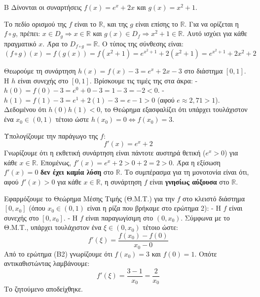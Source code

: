 \begin{thema}{Β}
Δίνονται οι συναρτήσεις $f(x) = e^x + 2x$ και $g(x) = x^2 + 1$.
\begin{erwthma}
\item Το πεδίο ορισμού της $f$ είναι το $\mathbb{R}$, και της $g$ είναι επίσης το $\mathbb{R}$.
Για να ορίζεται η $f \circ g$, πρέπει: $x \in D_g \Rightarrow x \in \mathbb{R}$ και $g(x) \in D_f \Rightarrow x^2+1 \in \mathbb{R}$. 
Αυτό ισχύει για κάθε πραγματικό $x$. Άρα το $D_{f\circ g} = \mathbb{R}$.
Ο τύπος της σύνθεσης είναι:
\[ (f \circ g)(x) = f(g(x)) = f(x^2+1) = e^{x^2+1} + 2(x^2+1) = e^{x^2+1} + 2x^2 + 2 \]

\item Θεωρούμε τη συνάρτηση $h(x) = f(x) - 3 = e^x + 2x - 3$ στο διάστημα $[0, 1]$.
Η $h$ είναι συνεχής στο $[0, 1]$.
Βρίσκουμε τις τιμές της στα άκρα:
- $h(0) = f(0) - 3 = e^0 + 0 - 3 = 1 - 3 = -2 < 0$.
- $h(1) = f(1) - 3 = e^1 + 2(1) - 3 = e - 1 > 0$ (αφού $e \approx 2,71 > 1$).
Δεδομένου ότι $h(0)h(1) < 0$, το Θεώρημα  εξασφαλίζει ότι υπάρχει τουλάχιστον ένα $x_0 \in (0, 1)$ τέτοιο ώστε $h(x_0) = 0 \Leftrightarrow f(x_0) = 3$.

\item Υπολογίζουμε την παράγωγο της $f$:
\[ f'(x) = e^x + 2 \]
Γνωρίζουμε ότι η εκθετική συνάρτηση είναι πάντοτε αυστηρά θετική ($e^x > 0$) για κάθε $x \in \mathbb{R}$.
Επομένως, $f'(x) = e^x + 2 > 0 + 2 = 2 > 0$. 
Άρα η εξίσωση $f'(x) = 0$ \textbf{δεν έχει καμία λύση} στο $\mathbb{R}$.
Το συμπέρασμα για τη μονοτονία είναι ότι, αφού $f'(x) > 0$ για κάθε $x \in \mathbb{R}$, η συνάρτηση $f$ είναι \textbf{γνησίως αύξουσα} στο $\mathbb{R}$.

\item Εφαρμόζουμε το Θεώρημα Μέσης Τιμής (Θ.Μ.Τ.) για την $f$ στο κλειστό διάστημα $[0, x_0]$ (όπου $x_0 \in (0, 1)$ είναι η ρίζα που βρήκαμε στο ερώτημα 2):
- Η $f$ είναι συνεχής στο $[0, x_0]$.
- Η $f$ είναι παραγωγίσιμη στο $(0, x_0)$.
Σύμφωνα με το Θ.Μ.Τ., υπάρχει τουλάχιστον ένα $\xi \in (0, x_0)$ τέτοιο ώστε:
\[ f'(\xi) = \frac{f(x_0) - f(0)}{x_0 - 0} \]
Από το ερώτημα (Β2) γνωρίζουμε ότι $f(x_0) = 3$ και $f(0) = 1$. Οπότε αντικαθιστώντας λαμβάνουμε:
\[ f'(\xi) = \frac{3 - 1}{x_0} = \frac{2}{x_0} \]
Το ζητούμενο αποδείχθηκε.
\end{erwthma}
\end{thema}

